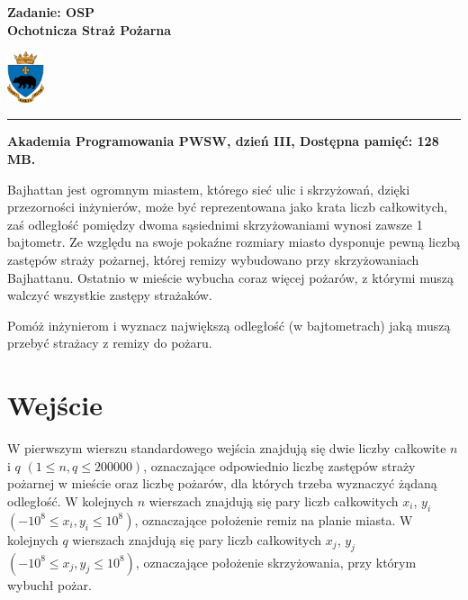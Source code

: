 \documentclass[10pt]{article}
\begin{document}
    

    \noindent
    \begin{minipage}{0.5\textwidth}
        \LARGE{\textsf{\textbf{Zadanie: OSP\\Ochotnicza Straż Pożarna}}}
    \end{minipage}
    \begin{minipage}{0.5\textwidth}
        \begin{flushright}
            \includegraphics[height=1.5cm]{logo.jpg}
        \end{flushright}
    \end{minipage}
    
    \noindent\rule{\textwidth}{0.4pt}
    
    \noindent\textbf{Akademia Programowania PWSW, dzień III, Dostępna pamięć: 128 MB.}
    \vspace{1em}
    
    
    \noindent
    Bajhattan jest ogromnym miastem, którego sieć ulic i skrzyżowań, dzięki przezorności inżynierów, może być reprezentowana jako krata liczb całkowitych, zaś odległość pomiędzy dwoma sąsiednimi skrzyżowaniami wynosi zawsze 1 bajtometr. Ze względu na swoje pokaźne rozmiary miasto dysponuje pewną liczbą zastępów straży pożarnej, której remizy wybudowano przy skrzyżowaniach Bajhattanu. Ostatnio w mieście wybucha coraz więcej pożarów, z którymi muszą walczyć wszystkie zastępy strażaków.
    
    Pomóż inżynierom i wyznacz największą odległość (w bajtometrach) jaką muszą przebyć strażacy z remizy do pożaru. 


    \section*{Wejście}
    
    W pierwszym wierszu standardowego wejścia znajdują się dwie liczby całkowite $n$ i $q$ $(1\leq n, q\leq 200000)$, oznaczające odpowiednio liczbę zastępów straży pożarnej w mieście oraz liczbę pożarów, dla których trzeba wyznaczyć żądaną odległość. W kolejnych $n$ wierszach znajdują się pary liczb całkowitych $x_{i}$, $y_{i}$ $(-10^{8} \leq x_{i}, y_{i} \leq 10^{8})$, oznaczające położenie remiz na planie miasta. W kolejnych $q$ wierszach znajdują się pary liczb całkowitych $x_{j}$, $y_{j}$ $(-10^{8} \leq x_{j}, y_{j} \leq 10^{8})$, oznaczające położenie skrzyżowania, przy którym wybuchł pożar.
\end{document}
